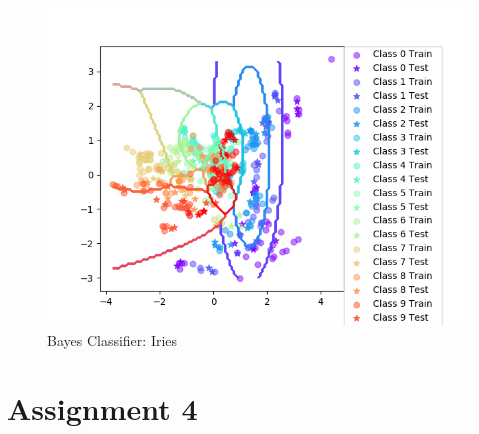 \documentclass{article}
\begin{document}
\begin{figure}
    \centering
    \includegraphics[scale = 0.75]{BayesVowel.png}
    \caption{Bayes Classifier: Iries}
\end{figure}

\section*{Assignment 4}
\end{document}
